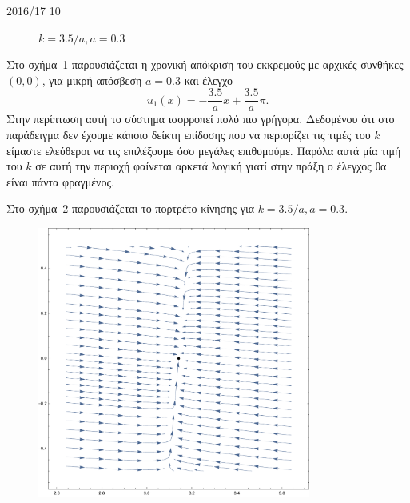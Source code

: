 \begin{solution}{2016/17 10}
\begin{figure}[h!]
{{        \( k = 3.5/a, a = 0.3 \)}}
        \label{fig:ex10_invPend35a}
    \end{figure}
    Στο σχήμα~\ref{fig:ex10_invPend35a} παρουσιάζεται η χρονική απόκριση του
    εκκρεμούς με αρχικές συνθήκες \( (0, 0) \), για μικρή απόσβεση \( a = 0.3 \) και έλεγχο
    \[
        u_1(x) = -\frac{3.5}{a}x + \frac{3.5}{a}\pi.
    \]
    Στην περίπτωση αυτή το σύστημα ισορροπεί πολύ πιο γρήγορα. Δεδομένου ότι στο
    παράδειγμα δεν έχουμε κάποιο δείκτη επίδοσης που να περιορίζει τις τιμές του
    \( k \) είμαστε ελεύθεροι να τις επιλέξουμε όσο μεγάλες επιθυμούμε. Παρόλα
    αυτά μία τιμή του \( k \) σε αυτή την περιοχή φαίνεται αρκετά λογική γιατί
    στην πράξη ο έλεγχος θα είναι πάντα φραγμένος.

    Στο σχήμα~\ref{fig:ex10_invPend35aComb} παρουσιάζεται το πορτρέτο κίνησης
    για \( k = 3.5/a, a = 0.3 \).
    \begin{figure}[h]
        \centering
        \includegraphics[width=0.8\textwidth]{figures/ex10_invPend35aComb.pdf}
        \caption{}
        \label{fig:ex10_invPend35aComb}
    \end{figure}


\end{solution}
